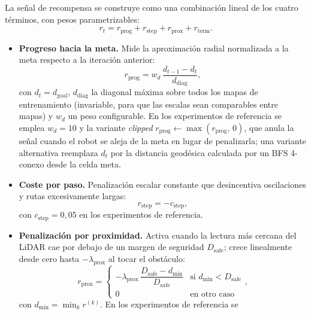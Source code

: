 La señal de recompensa se construye como una combinación lineal de los
cuatro términos, con pesos parametrizables:
\begin{equation}\label{eq:reward_total}
    r_t = r_{\text{prog}} + r_{\text{step}} + r_{\text{prox}} + r_{\text{term}}.
\end{equation}

\begin{itemize}
    \item \textbf{Progreso hacia la meta.} Mide la aproximación radial
    normalizada a la meta respecto a la iteración anterior:
    \begin{equation}
        r_{\text{prog}} = w_d\, \frac{d_{t-1} - d_t}{d_{\text{diag}}},
    \end{equation}
    con $d_t = d_{\text{goal}}$, $d_{\text{diag}}$ la diagonal máxima
    sobre todos los mapas de entrenamiento (invariable, para que las escalas
    sean comparables entre mapas) y $w_d$ un peso configurable. En los
    experimentos de referencia se emplea $w_d = 10$ y la variante
    \textit{clipped} $r_{\text{prog}} \leftarrow \max(r_{\text{prog}},\,0)$,
    que anula la señal cuando el robot se aleja de la meta en lugar de
    penalizarla; una variante alternativa reemplaza $d_t$ por la distancia
    geodésica calculada por un BFS 4-conexo desde la celda meta.
    \item \textbf{Coste por paso.} Penalización escalar constante que
    desincentiva oscilaciones y rutas excesivamente largas:
    \begin{equation}
        r_{\text{step}} = -c_{\text{step}},
    \end{equation}
    con $c_{\text{step}} = 0{,}05$ en los experimentos de referencia.
    \item \textbf{Penalización por proximidad.} Activa cuando la lectura
    más cercana del LiDAR cae por debajo de un margen de seguridad
    $D_{\text{safe}}$; crece linealmente desde cero hasta
    $-\lambda_{\text{prox}}$ al tocar el obstáculo:
    \begin{equation}
        r_{\text{prox}} = \begin{cases}
            -\lambda_{\text{prox}}\, \dfrac{D_{\text{safe}} - d_{\min}}{D_{\text{safe}}} &
            \text{si } d_{\min} < D_{\text{safe}}\\[0.4em]
            0 & \text{en otro caso}
        \end{cases},
    \end{equation}
    con $d_{\min} = \min_k r^{(k)}$. En los experimentos de referencia se

\end{itemize}
